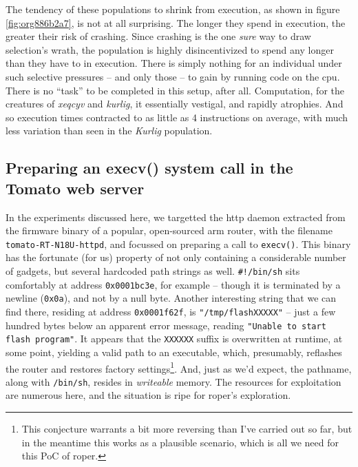 \documentclass[12pt,glossary]{dalthesis}
\begin{document}
The tendency of these populations to shrink from execution, as shown in figure
\ref{fig:org886b2a7}, is not at all surprising. The longer they spend in
execution, the greater their risk of crashing. Since crashing is the one \emph{sure}
way to draw selection's wrath, the population is highly disincentivized to spend
any longer than they have to in execution. There is simply nothing for an
individual under such selective pressures -- and only those -- to gain by
running code on the \gls{cpu}. There is no ``task'' to be completed in this setup,
after all. Computation, for the creatures of \emph{xeqcyv} and \emph{kurlig}, it essentially
vestigal, and rapidly atrophies. And so execution times contracted to as little
as 4 instructions on average, with much less variation than seen in the
\emph{Kurlig} population.

\subsection{Preparing an execv() system call in the Tomato web server}
\label{sec:orgff7dabe}
\label{org4b2d562}

In the experiments discussed here, we targetted the \gls{http} daemon extracted from
the firmware binary of a popular, open-sourced \gls{arm} router, with the filename
\texttt{tomato-RT-N18U-httpd}, and focussed on preparing a call to \texttt{execv()}. This binary
has the fortunate (for us) property of not only containing a considerable number
of gadgets, but several hardcoded path strings as well. \texttt{\#!/bin/sh} sits comfortably
at address \texttt{0x0001bc3e}, for example -- though it is terminated by a newline (\texttt{0x0a}),
and not by a null byte. Another interesting string that we can find there, residing
at address \texttt{0x0001f62f}, is \texttt{"/tmp/flashXXXXX"} -- just a few hundred bytes below an
apparent error message, reading \texttt{"Unable to start flash program"}. It appears that
the \texttt{XXXXXX} suffix is overwritten at runtime, at some point, yielding a valid path
to an executable, which, presumably, reflashes the router and restores factory
settings\footnote{This conjecture warrants a bit more reversing than I've carried out so far,
  but in the meantime this works as a plausible scenario, which is all we need
  for this PoC of \gls{roper}.}. And, just as we'd expect, the pathname, along with \texttt{/bin/sh}, resides in 
\emph{writeable} memory. The resources for exploitation are numerous here, and the
situation is ripe for \gls{roper}'s exploration.
\end{document}
